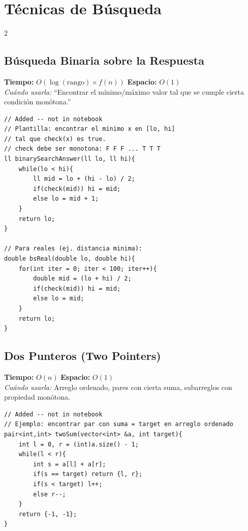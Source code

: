 \documentclass[10pt,a4paper]{article}
\begin{document}
\section{T\'ecnicas de B\'usqueda}
\begin{multicols}{2}

\subsection{B\'usqueda Binaria sobre la Respuesta}
\textbf{Tiempo:} $O(\log(\text{rango}) \times f(n))$ \quad \textbf{Espacio:} $O(1)$\\
\textit{Cu\'ando usarla:} ``Encontrar el m\'inimo/m\'aximo valor tal que se cumple cierta condici\'on mon\'otona.''

\begin{lstlisting}
// Added -- not in notebook
// Plantilla: encontrar el minimo x en [lo, hi]
// tal que check(x) es true.
// check debe ser monotona: F F F ... T T T
ll binarySearchAnswer(ll lo, ll hi){
    while(lo < hi){
        ll mid = lo + (hi - lo) / 2;
        if(check(mid)) hi = mid;
        else lo = mid + 1;
    }
    return lo;
}

// Para reales (ej. distancia minima):
double bsReal(double lo, double hi){
    for(int iter = 0; iter < 100; iter++){
        double mid = (lo + hi) / 2;
        if(check(mid)) hi = mid;
        else lo = mid;
    }
    return lo;
}
\end{lstlisting}

\subsection{Dos Punteros (Two Pointers)}
\textbf{Tiempo:} $O(n)$ \quad \textbf{Espacio:} $O(1)$\\
\textit{Cu\'ando usarla:} Arreglo ordenado, pares con cierta suma, subarreglos con propiedad mon\'otona.

\begin{lstlisting}
// Added -- not in notebook
// Ejemplo: encontrar par con suma = target en arreglo ordenado
pair<int,int> twoSum(vector<int> &a, int target){
    int l = 0, r = (int)a.size() - 1;
    while(l < r){
        int s = a[l] + a[r];
        if(s == target) return {l, r};
        if(s < target) l++;
        else r--;
    }
    return {-1, -1};
}
\end{lstlisting}


\end{multicols}
\end{document}
